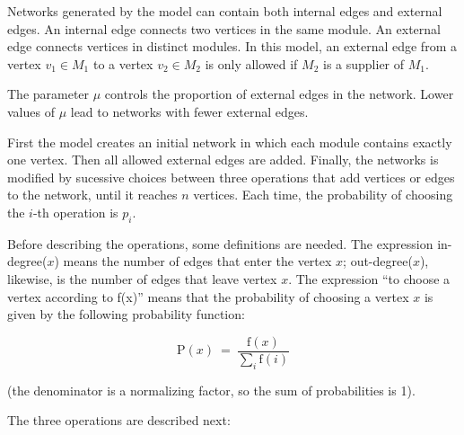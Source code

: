 Networks generated by the model can contain both internal edges and external
edges. An internal edge connects two vertices in the same module. An external
edge connects vertices in distinct modules. In this model, an external edge from
a vertex $v_1 \in M_1$ to a vertex $v_2 \in M_2$ is only allowed if $M_2$ is a
supplier of $M_1$.

The parameter $\mu$ controls the proportion of external edges in the network.
Lower values of $\mu$ lead to networks with fewer external edges. 

First the model creates an initial network in which each module contains exactly
one vertex. Then all allowed external edges are added. Finally, the networks is
modified by sucessive choices between three operations that add vertices or
edges to the network, until it reaches $n$ vertices. Each time, the probability
of choosing the $i$-th operation is $p_i$.

Before describing the operations, some definitions are needed. The expression
in-degree($x$) means the number of edges that enter the vertex $x$;
out-degree($x$), likewise, is the number of edges that leave vertex $x$. The
expression ``to choose a vertex according to f(x)'' means that the probability
of choosing a vertex $x$ is given by the following probability function:

$$
  \mathrm{P}(x) ~=~ \frac{ \mathrm{f}(x) }
  { \displaystyle\sum_{i} \mathrm{f}(i) }
$$

(the denominator is a normalizing factor, so the sum of probabilities is 1).

The three operations are described next:

